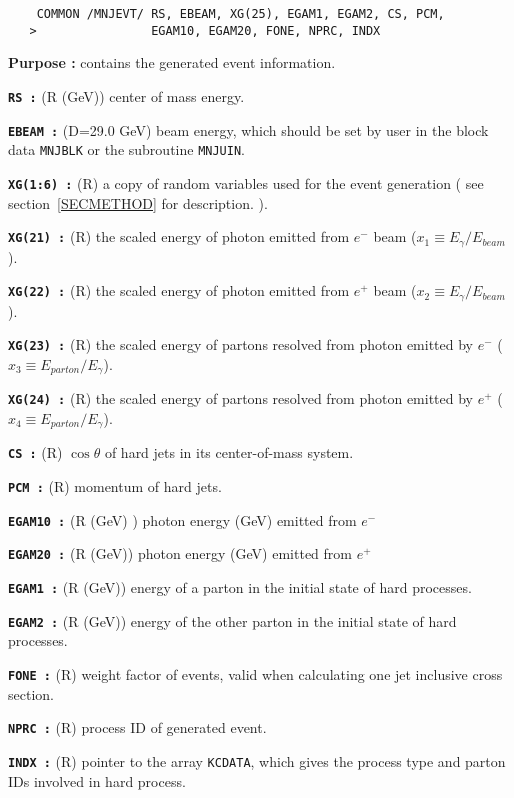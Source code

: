 \newlength{\MNJEVT}
\settowidth{\MNJEVT}{\tt x COMMON /MNJEVT/ RS, EBEAM, XG(25), EGAM1, EGAM2, CS, PCM,}
\begin{verbatim}
    COMMON /MNJEVT/ RS, EBEAM, XG(25), EGAM1, EGAM2, CS, PCM,
   >                EGAM10, EGAM20, FONE, NPRC, INDX
\end{verbatim}
\vspace{-42pt}
\hspace*{3ex}\fbox{\rule[28pt]{\MNJEVT}{0cm}}
\begin{list}{ }{\parsep=0pt \itemsep=0pt \topsep=0pt }
\item[\bf Purpose :] contains the generated event information. 
\item[\bf \tt RS :] (R (GeV)) center of mass energy.
\item[\bf \tt EBEAM :] (D=29.0 GeV) beam energy, which should be set
by user in the block data {\tt MNJBLK} or the subroutine {\tt MNJUIN}.
\item[\bf \tt XG(1:6) :] (R) a copy of random variables used for the
event generation ( see section~\ref{SECMETHOD} for description. ).
\item[\bf \tt XG(21) :] (R) the scaled energy of photon emitted from
$e^-$ beam ($x_1 \equiv E_{\gamma} / E_{beam}$).
\item[\bf \tt XG(22) :] (R) the scaled energy of photon emitted from
$e^+$ beam ($x_2 \equiv E_{\gamma} / E_{beam}$).
\item[\bf \tt XG(23) :] (R) the scaled energy of partons resolved
from photon emitted by  $e^-$ ($x_3 \equiv E_{parton} / E_{\gamma}$).
\item[\bf \tt XG(24) :] (R) the scaled energy of partons resolved
from photon emitted by $e^+$ ($x_4 \equiv E_{parton} / E_{\gamma}$).
\item[\bf \tt  CS :] (R) $\cos\theta$ of hard jets in its
center-of-mass system.
\item[\bf \tt  PCM :] (R) momentum of hard jets.
\item[\bf \tt EGAM10 :] (R (GeV) ) photon energy (GeV) emitted from
$e^-$ 
\item[\bf \tt EGAM20 :] (R (GeV)) photon energy (GeV) emitted
from $e^+$ 
\item[\bf \tt EGAM1 :] (R (GeV)) energy of a parton in the initial
state of hard processes.
\item[\bf \tt EGAM2 :] (R (GeV)) energy of the other parton in the initial
state of hard processes.
\item[\bf \tt FONE :] (R) weight factor of events, valid when
calculating one jet inclusive cross section.
\item[\bf \tt NPRC :] (R) process ID of generated event.
\item[\bf \tt INDX :] (R) pointer to the array {\tt KCDATA}, which
gives the process type and parton IDs involved in hard process.

\end{list}

